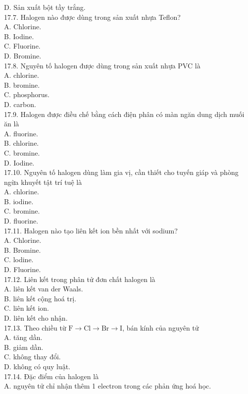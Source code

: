 \documentclass[10pt]{article}
\begin{document}
D. Sản xuất bột tầy trắng.\\
17.7. Halogen nào được dùng trong sản xuất nhựa Teflon?\\
A. Chlorine.\\
B. Iodine.\\
C. Fluorine.\\
D. Bromine.\\
17.8. Nguyên tố halogen được dùng trong sản xuất nhựa PVC là\\
A. chlorine.\\
B. bromine.\\
C. phosphorus.\\
D. carbon.\\
17.9. Halogen được điều chế bằng cách điện phân có màn ngăn dung dịch muối ăn là\\
A. fluorine.\\
B. chlorine.\\
C. bromine.\\
D. Iodine.\\
17.10. Nguyên tố halogen dùng làm gia vị, cần thiết cho tuyến giáp và phòng ngừa khuyết tật trí tuệ là\\
A. chlorine.\\
B. iodine.\\
C. bromine.\\
D. fluorine.\\
17.11. Halogen nào tạo liên kết ion bền nhất với sodium?\\
A. Chlorine.\\
B. Bromine.\\
C. lodine.\\
D. Fluorine.\\
17.12. Liên kết trong phân tử đơn chất halogen là\\
A. liên kết van der Waals.\\
B. liên kết cộng hoá trị.\\
C. liên kết ion.\\
D. liên kết cho nhận.\\
17.13. Theo chiều từ $\mathrm{F} \rightarrow \mathrm{Cl} \rightarrow \mathrm{Br} \rightarrow \mathrm{I}$, bán kính của nguyên tử\\
A. tăng dần.\\
B. giảm dần.\\
C. không thay đổi.\\
D. không có quy luật.\\
17.14. Đặc điểm của halogen là\\
A. nguyên tử chỉ nhận thêm 1 electron trong các phản ứng hoá học.\\
\end{document}
